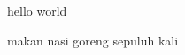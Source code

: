 \documentclass{article}
\begin{document}
  hello world
  
  makan nasi goreng sepuluh kali
\end{document}
